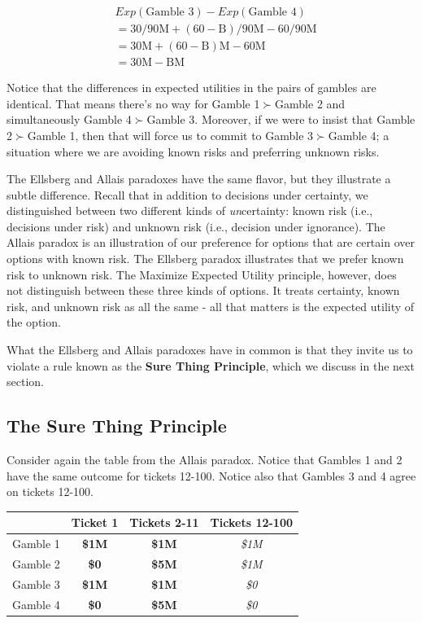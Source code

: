 \documentclass[]{tufte-book}
\begin{document}
\[
\begin{split}
& Exp(\text{Gamble 3}) - Exp(\text{Gamble 4})  \\
&= 30/90\text{M} + (60-\text{B})/90\text{M}-60/90\text{M}  \\
&= 30\text{M} + (60-\text{B})\text{M} - 60\text{M} \\
&= 30\text{M} - \text{BM}
\end{split}
\]

Notice that the differences in expected utilities in the pairs of gambles are identical. That means there's no way for Gamble 1\(\succ\)Gamble 2 and simultaneously Gamble 4\(\succ\)Gamble 3. Moreover, if we were to insist that Gamble 2\(\succ\)Gamble 1, then that will force us to commit to Gamble 3\(\succ\)Gamble 4; a situation where we are avoiding known risks and preferring unknown risks.

The Ellsberg and Allais paradoxes have the same flavor, but they illustrate a subtle difference. Recall that in addition to decisions under certainty, we distinguished between two different kinds of \emph{un}certainty: known risk (i.e., decisions under risk) and unknown risk (i.e., decision under ignorance). The Allais paradox is an illustration of our preference for options that are certain over options with known risk. The Ellsberg paradox illustrates that we prefer known risk to unknown risk. The Maximize Expected Utility principle, however, does not distinguish between these three kinds of options. It treats certainty, known risk, and unknown risk as all the same - all that matters is the expected utility of the option.

What the Ellsberg and Allais paradoxes have in common is that they invite us to violate a rule known as the \textbf{Sure Thing Principle}, which we discuss in the next section.

\hypertarget{the-sure-thing-principle}{%
\subsection{The Sure Thing Principle}\label{the-sure-thing-principle}}

Consider again the table from the Allais paradox. Notice that Gambles 1 and 2 have the same outcome for tickets 12-100. Notice also that Gambles 3 and 4 agree on tickets 12-100.

\begin{longtable}[]{@{}lccc@{}}
\toprule
& Ticket 1 & Tickets 2-11 & Tickets 12-100\tabularnewline
\midrule
\endhead
Gamble 1 & \textbf{\$1M} & \textbf{\$1M} & \emph{\$1M}\tabularnewline
Gamble 2 & \textbf{\$0} & \textbf{\$5M} & \emph{\$1M}\tabularnewline
Gamble 3 & \textbf{\$1M} & \textbf{\$1M} & \emph{\$0}\tabularnewline
Gamble 4 & \textbf{\$0} & \textbf{\$5M} & \emph{\$0}\tabularnewline
\bottomrule
\end{longtable}
\end{document}
